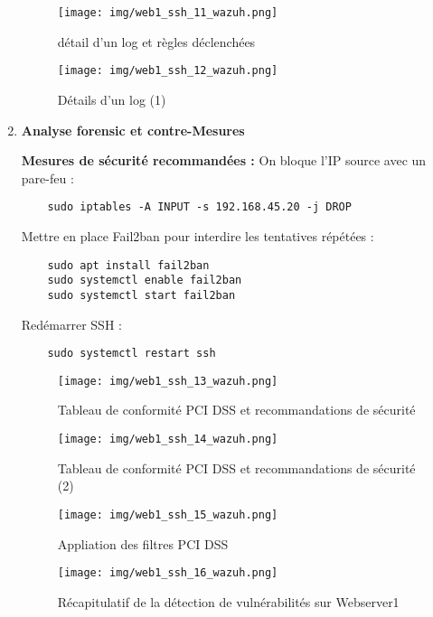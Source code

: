 \documentclass[a4paper,12pt]{report}
\begin{document}
\begin{enumerate}
    \begin{figure}[H]
        \centering
        \texttt{[image: img/web1\_ssh\_11\_wazuh.png]}
        \caption{détail d'un log et règles déclenchées}
    \end{figure}

     \begin{figure}[H]
        \centering
        \texttt{[image: img/web1\_ssh\_12\_wazuh.png]}
        \caption{Détails d'un log (1)}
    \end{figure}

    \item \textbf{Analyse forensic et contre-Mesures}  

    

    \textbf{Mesures de sécurité recommandées :}  
    On bloque l’IP source avec un pare-feu :  

    \begin{lstlisting}
    sudo iptables -A INPUT -s 192.168.45.20 -j DROP
    \end{lstlisting}

     Mettre en place Fail2ban pour interdire les tentatives répétées :
    
    \begin{lstlisting}
    sudo apt install fail2ban
    sudo systemctl enable fail2ban
    sudo systemctl start fail2ban
    \end{lstlisting}

   
    
    Redémarrer SSH :
    \begin{lstlisting}
    sudo systemctl restart ssh
    \end{lstlisting}

    \begin{figure}[H]
        \centering
        \texttt{[image: img/web1\_ssh\_13\_wazuh.png]}
        \caption{Tableau de conformité PCI DSS et recommandations de sécurité}
    \end{figure}

\begin{figure}[H]
        \centering
        \texttt{[image: img/web1\_ssh\_14\_wazuh.png]}
        \caption{Tableau de conformité PCI DSS et recommandations de sécurité (2)}
    \end{figure}
    \begin{figure}[H]
        \centering
        \texttt{[image: img/web1\_ssh\_15\_wazuh.png]}
        \caption{Appliation des filtres PCI DSS }
    \end{figure}
    \begin{figure}[H]
        \centering
        \texttt{[image: img/web1\_ssh\_16\_wazuh.png]}
        \caption{Récapitulatif de la détection de vulnérabilités sur Webserver1}
    \end{figure}
\end{enumerate}
\end{document}
